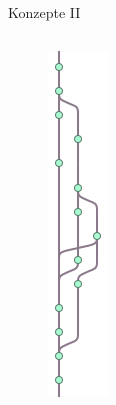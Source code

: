 \documentclass[18pt]{beamer}
\begin{document}
\begin{frame}{Konzepte II}
	\begin{columns}
			\begin{figure}
				\includegraphics[width=\linewidth]{images/branchmerge.png}
			\end{figure}


\end{columns}
\end{frame}
\end{document}
